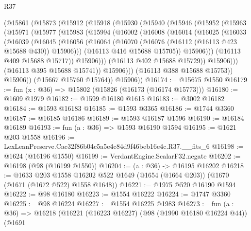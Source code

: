 \begin{lexlean}{R37}
\begin{coremodule}
      (@15861
        (@15873
          (@15912
            (@15918
              (@15930
                (@15940
                  (@15946
                    (@15952
                      (@15963
                        (@15971
                          (@15977
                            (@15983
                              (@15994
                                (@16002
                                  (@16008
                                    (@16014
                                      (@16025
                                        (@16033
                                          (@16039
                                            (@16045
                                              (@16056
                                                (@16064
                                                  (@16070
                                                    (@16076
                                                      (@16112 (@16113 @423 @15688 @430))
                                                      @15906)))
                                                (@16113 @416 @15688 @15705))
                                              @15906)))
                                        (@16113 @409 @15688 @15717))
                                      @15906)))
                                (@16113 @402 @15688 @15729))
                              @15906)))
                        (@16113 @395 @15688 @15741))
                      @15906)))
                (@16113 @388 @15688 @15753))
              @15906))
          (@15667 @15760 @15764))
        @15906))
@16174 := @15675 @1550
@16179 := fun (x : @36) => @15802 (@15826 (@16173 (@16174 @15773)))
@16180 := @1609 @1979
@16182 := @1599 @16180 @1615
@16183 := @3002 @16182
@16184 := @1593 @16183
@16185 := @1593 @3365
@16186 := @1744 @3360
@16187 := @16185 @16186
@16189 := @1593 @16187 @1596
@16190 := @16184 @16189
@16193 := fun (a : @36) => @1593 @16190 @1594
@16195 := @1621 @203 @1558
@16196 := LexLeanPreserve.Cac32f86b04c5a5e4c84d9f46beb16e4c.R37.__fits_6
@16198 := @1624 (@16196 @1550)
@16199 := VerdantEngine.ScalarF32.negate
@16202 := @16198 (@98 (@16199 @1550))
@16204 := (a : @36) -> @16195 @16202
@16218 := @1633
    @203
    @1558
    @16202
    @522
    @1649
    (@1654 (@1664 @203))
    (@1670 (@1671 (@1672 @522) @1558 @1648))
@16221 := @1975 @520 @16190 @1594
@16222 := @98 @16180
@16223 := @1554 @16222
@16224 := @1747 @3360
@16225 := @98 @16224
@16227 := @1554 @16225 @1983
@16273 := fun (a : @36) =>
  @16218
    (@16221
      (@16223 @16227)
      (@98 (@1990 @16180 @16224 @44))
      (@1691

\end{coremodule}
\end{lexlean}
